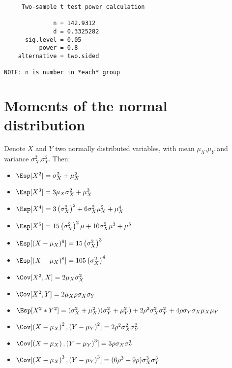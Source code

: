 \documentclass[12pt]{article}
\begin{document}
\begin{verbatim}
     Two-sample t test power calculation 

              n = 142.9312
              d = 0.3325282
      sig.level = 0.05
          power = 0.8
    alternative = two.sided

NOTE: n is number in *each* group
\end{verbatim}


\clearpage
\appendix

\section{Moments of the normal distribution}
\label{SM:moments}
Denote \(X\) and \(Y\) two normally distributed variables, with mean
\(\mu_X\),\(\mu_Y\) and variance \(\sigma^2_X\),\(\sigma^2_Y\). Then:
\begin{itemize}
\item \(\Esp[X^2] = \sigma^2_X + \mu_X^2\)
\item \(\Esp[X^3] = 3 \mu_X \sigma^2_X + \mu_X^3\)
\item \(\Esp[X^4]=3\left(\sigma^2_X\right)^2 + 6 \sigma^2_X \mu_X^2 + \mu_X^4\)
\item \(\Esp[X^5]=15 \left(\sigma^2_X\right)^2 \mu + 10 \sigma^2_X \mu^3 + \mu^5\)
\item \(\Esp[(X-\mu_X)^6]= 15\left(\sigma_X^2\right)^3\)
\item \(\Esp[(X-\mu_X)^8]= 105\left(\sigma_X^2\right)^4\)
\end{itemize}
\bigskip

\begin{itemize}
\item \(\Cov[X^2,X]=2 \mu_X \sigma^2_X\)
\item \(\Cov[X^2,Y]=2 \mu_X \rho \sigma_X \sigma_Y\)
\item \(\Esp[X^2*Y^2] = (\sigma^2_X+\mu_X^2)(\sigma^2_Y+\mu_Y^2) + 2 \rho^2 \sigma^2_X \sigma^2_Y + 4 \rho \sigma_Y \sigma_X \mu_X \mu_Y\)
\item \(\Cov[\left(X-\mu_X\right)^2,\left(Y-\mu_Y\right)^2] = 2 \rho^2 \sigma^2_X \sigma^2_Y\)
\item \(\Cov[\left(X-\mu_X\right),\left(Y-\mu_Y\right)^3] = 3 \rho \sigma_X \sigma^3_Y\)
\item \(\Cov[\left(X-\mu_X\right)^3,\left(Y-\mu_Y\right)^3] = (6 \rho^3 + 9\rho) \sigma^3_X \sigma^3_Y\)
\end{itemize}
\clearpage
\end{document}

